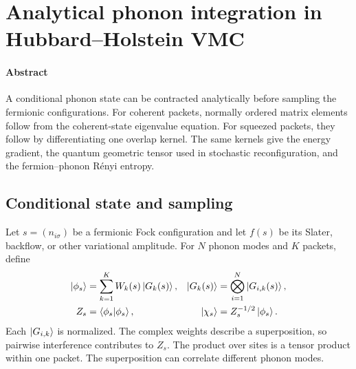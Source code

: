 \documentclass[../../main.tex]{subfiles}
\begin{document}
\section{Analytical phonon integration in Hubbard--Holstein VMC}

\paragraph{Abstract}
A conditional phonon state can be contracted analytically before sampling the
fermionic configurations. For coherent packets, normally ordered matrix
elements follow from the coherent-state eigenvalue equation. For squeezed
packets, they follow by differentiating one overlap kernel. The same kernels
give the energy gradient, the quantum geometric tensor used in stochastic
reconfiguration, and the fermion--phonon R\'enyi entropy.


\subsection{Conditional state and sampling}
\label{sec:state}

Let \(s=(n_{i\sigma})\) be a fermionic Fock configuration and let
\(f(s)\) be its Slater, backflow, or other variational amplitude. For
\(N\) phonon modes and \(K\) packets, define
\begin{align}
 \left\lvert \phi_s \right\rangle &= \sum_{k=1}^K W_k(s)\left\lvert G_k(s) \right\rangle, &
 \left\lvert G_k(s) \right\rangle &= \bigotimes_{i=1}^{N}\left\lvert G_{i,k}(s) \right\rangle, \label{eq:packets}\\
 Z_s &= \left\langle \phi_s \middle| \phi_s \right\rangle, &
 \left\lvert \chi_s \right\rangle &= Z_s^{-1/2}\left\lvert \phi_s \right\rangle. \label{eq:normalized-conditional}
\end{align}
Each \(\left\lvert G_{i,k} \right\rangle\) is normalized. The complex weights describe a
superposition, so pairwise interference contributes to \(Z_s\).
The product over sites is a tensor product within one packet. The
superposition can correlate different phonon modes.
\end{document}
